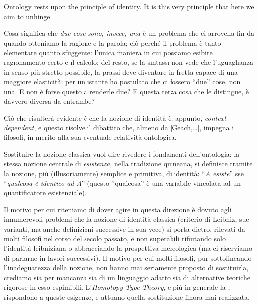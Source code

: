 	
	Ontology rests upon the principle of identity. It is this very principle that here we aim to unhinge.

	Cosa significa che \emph{due cose sono, invece, una} è un problema che ci arrovella fin da quando otteniamo la ragione e la parola; ciò perché il problema è tanto elementare quanto sfuggente: l'unica maniera in cui possiamo esibire ragionamento certo è il calcolo; del resto, se la sintassi non vede che l'uguaglianza in senso più stretto possibile, la prassi deve diventare in fretta capace di una maggiore elasticità: per un istante ho postulato che ci fossero ``due'' cose, non una. E non è forse questo a renderle due? E questa terza cosa che le distingue, è davvero diversa da entrambe?

	Ciò che risulterà evidente è che la nozione di identità è, appunto, \emph{context-dependent}, e questo risolve il dibattito che, almeno da [Geach,\dots], impegna i filosofi, in merito alla sua eventuale relatività ontologica.

	Sostituire la nozione classica vuol dire rivedere i fondamenti dell'ontologia: la stessa nozione centrale di \emph{esistenza}, nella tradizione quineana, si definisce tramite la nozione, più (illusoriamente) semplice e primitiva, di identità: ``\textit{A esiste}'' sse ``\textit{qualcosa è identico ad A}'' (questo ``qualcosa'' è una variabile vincolata ad un quantificatore esistenziale).

	Il motivo per cui riteniamo di dover agire in questa direzione è dovuto agli innumerevoli problemi che la nozione di identità classica (criterio di Leibniz, sue varianti, ma anche definizioni successive in sua vece) si porta dietro, rilevati da molti filosofi nel corso del secolo passato, e non superabili rifiutando solo l'identità leibniziana o abbracciando la prospettiva mereologica (ma ci riserviamo di parlarne in lavori successivi). Il motivo per cui molti filosofi, pur sottolineando l'inadeguatezza della nozione, non hanno mai seriamente proposto di sostituirla, crediamo sia per mancanza sia di un linguaggio adatto sia di alternative teoriche rigorose in esso espimibili.
	L'\textit{Homotopy Type Theory}, e più in generale la \CT, rispondono a queste esigenze, e attuano quella sostituzione finora mai realizzata. \endfo


	

